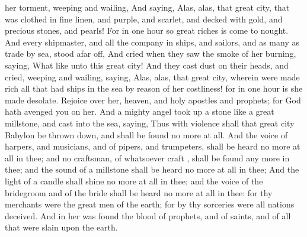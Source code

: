 {her
torment,
weeping
and
wailing,
And
saying,
Alas,
alas, that
great
city, that was
clothed in fine
linen,
and
purple,
and
scarlet,
and
decked
with
gold,
and
precious
stones,
and
pearls!
For in
one
hour so
great
riches is come to
nought.
And
every
shipmaster,
and
all the
company
in
ships,
and
sailors,
and as many
as trade
by
sea,
stood
afar
off,
And
cried when they
saw the
smoke of
her
burning,
saying,
What
{} like
unto this
great
city!
And they
cast
dust
on
their
heads,
and
cried,
weeping
and
wailing,
saying,
Alas,
alas,
that
great
city,
wherein were made
rich
all that
had
ships
in the
sea by reason
of
her
costliness!
for in
one
hour is she made
desolate.
Rejoice
over
her,
{}
heaven,
and
{}
holy
apostles
and
prophets;
for
God
hath
avenged
you
on
her.
And
a
mighty
angel took
up a
stone
like a
great
millstone,
and
cast
{}
into the
sea,
saying,
Thus with
violence
shall that
great
city
Babylon be thrown
down,
and shall be
found
no
more at
all.
And the
voice of
harpers,
and
musicians,
and of
pipers,
and
trumpeters, shall be
heard
no
more at
all
in
thee;
and
no
craftsman, of
whatsoever
craft
{}, shall be
found
any
more
in
thee;
and the
sound of a
millstone shall be
heard
no
more at
all
in
thee;
And the
light of a
candle shall
shine
no
more at
all
in
thee;
and the
voice of the
bridegroom
and of the
bride shall be
heard
no
more at
all
in
thee:
for
thy
merchants
were the great
men of the
earth;
for
by
thy
sorceries
were
all
nations
deceived.
And
in
her was
found the
blood of
prophets,
and of
saints,
and of
all that were
slain
upon the
earth.

}
